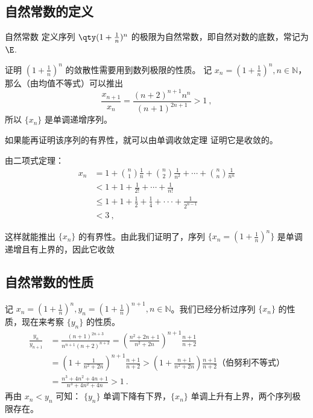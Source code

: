 

\subsection{自然常数的定义}
\begin{definition}{自然常数}
定义序列 $\qty(1+\frac{1}{n})^n$ 的极限为自然常数，即自然对数的底数，常记为$\E$.
\end{definition}
证明 $(1+\frac{1}{n})^n$ 的敛散性需要用到数列极限的性质。
记 $x_n=(1+\frac{1}{n})^n, n\in \mathbb{N}$，那么（由均值不等式）可以推出
\begin{equation}
  \frac{x_{n+1}}{x_n}=\frac{(n+2)^{n+1}n^{n}}{(n+1)^{2n+1}}>1~,
\end{equation}
所以 $\{x_n\}$ 是单调递增序列。

  如果能再证明该序列的有界性，就可以由单调收敛定理  证明它是收敛的。

由二项式定理：
\begin{equation}\label{eq_exp_1}
\begin{aligned}
  x_n&=1+{n\choose 1}\frac{1}{n}+{n\choose 2}\frac{1}{n^2}+\cdots+{n\choose n}\frac{1}{n^n}\\
  &<1+1+\frac{1}{2!}+\cdots+\frac{1}{n!}\\
  &\leq1+1+\frac{1}{2}+\frac{1}{4}+\cdot\cdot\cdot+\frac{1}{2^{n-1}}\\
  &<3~,
\end{aligned}
\end{equation}

这样就能推出 $\{x_n\}$ 的有界性。由此我们证明了，序列 $\{x_n=(1+\frac{1}{n})^n\}$ 是单调递增且有上界的，因此它收敛

  
\subsection{自然常数的性质}
  记 $x_n=(1+\frac{1}{n})^n,y_n=(1+\frac{1}{n})^{n+1}, n\in \mathbb{N}$。我们已经分析过序列 $\{x_n\}$ 的性质，现在来考察 $\{y_n\}$ 的性质。
\begin{equation}
  \begin{aligned}
  \frac{y_n}{y_{n+1}}&=\frac{(n+1)^{2n+3}}{n^{n+1}(n+2)^{n+2}}=\left(\frac{n^2+2n+1}{n^2+2n}\right)^{n+1}\frac{n+1}{n+2}\\
  &=(1+\frac{1}{n^2+2n})^{n+1}\frac{n+1}{n+2}>\left(1+\frac{n+1}{n^2+2n}\right)\frac{n+1}{n+2} \text{（伯努利不等式）}\\
  &=\frac{n^3+4n^2+4n+1}{n^3+4n^2+4n}>1~.
  \end{aligned}
\end{equation}
  再由 $x_n<y_n$ 可知： $\{y_n\}$ 单调下降有下界，$\{x_n\}$ 单调上升有上界，两个序列极限存在。

